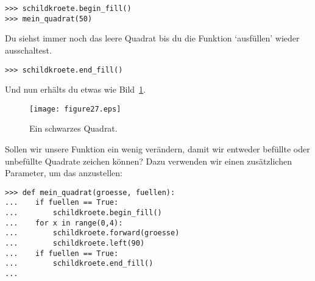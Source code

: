 \begin{Verbatim}[frame=single]
>>> schildkroete.begin_fill()
>>> mein_quadrat(50)
\end{Verbatim}

\noindent
Du siehst immer noch das leere Quadrat bis du die Funktion `ausfüllen' wieder ausschaltest.

\begin{Verbatim}[frame=single]
>>> schildkroete.end_fill()
\end{Verbatim}

\noindent
Und nun erhälts du etwas wie Bild~\ref{fig27}.

\begin{figure}
\begin{center}
\texttt{[image: figure27.eps]}
\end{center}
\caption{Ein schwarzes Quadrat.}\label{fig27}
\end{figure}

Sollen wir unsere Funktion ein wenig verändern, damit wir entweder befüllte oder unbefüllte Quadrate zeichen können? Dazu verwenden wir einen zusätzlichen Parameter, um das anzustellen:

\begin{Verbatim}[frame=single]
>>> def mein_quadrat(groesse, fuellen):
...    if fuellen == True:
...        schildkroete.begin_fill()
...    for x in range(0,4):
...        schildkroete.forward(groesse)
...        schildkroete.left(90)
...    if fuellen == True:
...        schildkroete.end_fill()
...
\end{Verbatim}

